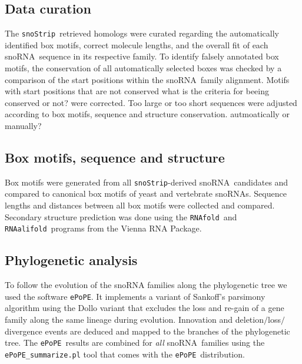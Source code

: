 \documentclass[preprint,3p,times,twocolumn]{elsarticle}
\newcommand{\JH}[1]{\begingroup\color{purple}#1\endgroup}
\newcommand{\sno}{snoRNA}
\newcommand{\snostrip}{\texttt{snoStrip}}
\newcommand{\epope}{\texttt{ePoPE}}
\newcommand{\fold}{\texttt{RNAfold}}
\newcommand{\alifold}{\texttt{RNAalifold}}
\begin{document}
\subsection{Data curation}

The \snostrip\ retrieved homologs were curated regarding the automatically identified box motifs, correct molecule lengths, and the overall fit of each \sno\ sequence in its respective family. 
To identify falsely annotated box motifs, the conservation
of all automatically selected  boxes was checked by a comparison
of the start positions within the \sno\ family alignment. Motifs with start positions that are not conserved \JH{what is the criteria for beeing conserved or not?} were corrected. 
Too large or too short sequences were adjusted according to box motifs, sequence and structure conservation. \JH{autmoatically or manually?} 

\subsection{Box motifs, sequence and structure}

Box motifs were generated from all \snostrip-derived \sno\ candidates and compared to canonical box motifs of yeast and vertebrate snoRNAs. 
Sequence lengths and distances between all box motifs were collected and compared. Secondary structure prediction was done using the \fold\ and \alifold\ programs from the Vienna RNA Package\cite{Hofacker:1994}. 

\subsection{Phylogenetic analysis}

To follow the evolution of the snoRNA families along the phylogenetic tree we used the software \epope\cite{Hertel:2015}. 
It implements a variant of Sankoff’s parsimony algorithm using the Dollo variant that excludes the loss and re-gain of a gene family along the same lineage during evolution. 
Innovation and deletion$/$loss$/$divergence events are deduced and mapped to the branches of the phylogenetic tree. 
The \epope\ results are combined for \emph{all} \sno\ families 
using the \texttt{ePoPE\_summarize.pl} tool that comes with the \epope\ distribution.
\end{document}
